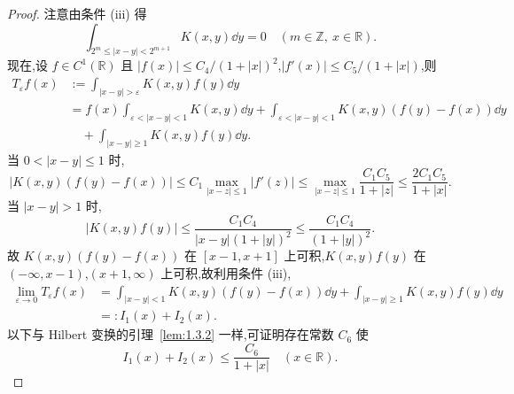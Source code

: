 \begin{proof}
注意由条件 (iii) 得
\begin{equation}\tag{1.10.8}
\int_{2^{m} \leq |x - y| < 2^{m+1}}K(x, y)\dd y = 0 \quad (m \in \mathbb{Z},\ x \in \mathbb{R}).
\label{eq:1.10.8}\end{equation}
现在,设 $f \in C^{1}(\mathbb{R})$ 且 $|f(x)| \leq C_{4}/(1 + |x|)^{2}$,$|f'(x)| \leq C_{5}/(1 + |x|)$,则
\begin{align*}
T_{\varepsilon}f(x)&:= \displaystyle\int_{|x - y| > \varepsilon}K(x, y)f(y)\dd y  \\
&= f(x)\displaystyle\int_{\varepsilon < |x - y| < 1}K(x, y)\dd y + \int_{\varepsilon < |x - y| < 1}K(x, y)\left(f(y) - f(x)\right)\dd y \\
&\quad + \displaystyle\int_{|x - y| \geq 1}K(x, y)f(y)\dd y.
\end{align*}
当 $0 < |x - y| \leq 1$ 时,
\begin{equation*}
|K(x, y)\left(f(y) - f(x)\right)| \leq C_{1}\max_{|x - z| \leq 1}|f'(z)| \leq \max_{|x - z| \leq 1}\frac{C_{1}C_{5}}{1 + |z|} \leq \frac{2C_{1}C_{5}}{1 + |x|}.
\end{equation*}
当 $|x - y| > 1$ 时,
\begin{equation*}
|K(x, y)f(y)| \leq \frac{C_{1}C_{4}}{|x - y|(1 + |y|)^{2}} \leq \frac{C_{1}C_{4}}{(1 + |y|)^{2}}.
\end{equation*}
故 $K(x, y)\left(f(y) - f(x)\right)$ 在 $[x - 1, x + 1]$ 上可积,$K(x, y)f(y)$ 在 $(-\infty, x - 1)$,$(x + 1, \infty)$ 上可积,故利用条件 (iii),
\begin{align*}
\lim_{\varepsilon \to 0}T_{\varepsilon}f(x) &= \displaystyle\int_{|x - y| < 1}K(x, y)\left(f(y) - f(x)\right)\dd y + \int_{|x - y| \geq 1}K(x, y)f(y)\dd y \\
&=: I_{1}(x) + I_{2}(x).
\end{align*}
以下与 Hilbert 变换的引理~\ref{lem:1.3.2} 一样,可证明存在常数 $C_{6}$ 使
\begin{equation*}
I_{1}(x) + I_{2}(x) \leq \frac{C_{6}}{1 + |x|} \quad (x \in \mathbb{R}).
\end{equation*}


\end{proof}
